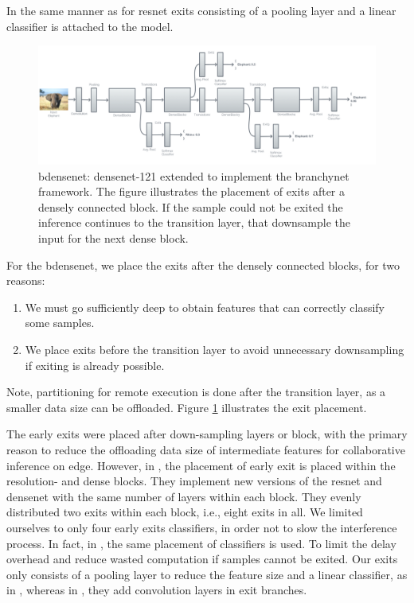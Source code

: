 In the same manner as for \gls{resnet} exits consisting of a pooling layer and a linear classifier is attached to the model.
\begin{figure}
	\centering
	\includegraphics[width=\linewidth]{figures/models/b-densenet}
	\caption[B-\gls{densenet} architecture]{\gls{bdensenet}: \gls{densenet}-121 extended to implement the \gls{branchynet} framework. The figure illustrates the placement of exits after a densely connected block. If the sample could not be exited the inference continues to the transition layer, that downsample the input for the next dense block. }
	\label{fig:b-densenet}
\end{figure}
For the \gls{bdensenet}, we place the exits after the densely connected blocks, for two reasons: 
\begin{enumerate}
	\item We must go sufficiently deep to obtain features that can correctly classify some samples.
	\item We place exits before the transition layer to avoid unnecessary downsampling if exiting is already possible. 
\end{enumerate}
Note, partitioning for remote execution is done after the transition layer, as a smaller data size can be offloaded. Figure \ref{fig:b-densenet} illustrates the exit placement.

The early exits were placed after down-sampling layers or block, with the primary reason to reduce the offloading data size of intermediate features for collaborative inference on edge. However, in \cite{huang_multi-scale_2017}, the placement of early exit is placed within the resolution- and dense blocks. They implement new versions of the \gls{resnet} and \gls{densenet} with the same number of layers within each block. They evenly distributed two exits within each block, i.e., eight exits in all. We limited ourselves to only four early exits classifiers, in order not to slow the interference process. In fact, in \cite{berestizshevsky_sacrificing_2019}, the same placement of classifiers is used. To limit the delay overhead and reduce wasted computation if samples cannot be exited. Our exits only consists of a pooling layer to reduce the feature size and a linear classifier, as in \cite{kaya_shallow-deep_nodate}, whereas in \cite{teerapittayanon_branchynet:_2016}, they add convolution layers in exit branches. 


